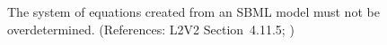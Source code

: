 The system of equations created from an SBML model must not be
overdetermined.  (References: L2V2 Section~4.11.5; )

